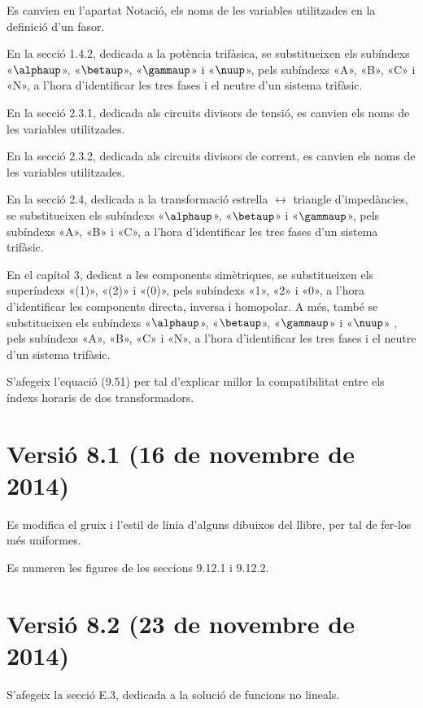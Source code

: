 Es canvien en l'apartat Notació, els noms de les variables utilitzades en la definició d'un fasor.

En la secció 1.4.2, dedicada a la potència trifàsica, se substitueixen els subíndexs «$\alphaup$», «$\betaup$», «$\gammaup$» i «$\nuup$», pels subíndexs «A», «B», «C» i «N», a l'hora d'identificar les tres fases  i el neutre d'un sistema trifàsic.

En la secció 2.3.1,  dedicada als circuits divisors de tensió, es canvien els noms de les variables utilitzades.

En la secció 2.3.2,  dedicada als circuits divisors de corrent, es canvien els noms de les variables utilitzades.

En la secció 2.4, dedicada a la transformació estrella $\boldsymbol{\leftrightarrow}$ triangle d'impedàncies, se substitueixen els subíndexs «$\alphaup$», «$\betaup$» i «$\gammaup$», pels subíndexs «A», «B» i «C», a l'hora d'identificar les tres fases d'un sistema trifàsic.

En el capítol 3, dedicat a les components simètriques, se substitueixen els superíndexs «(1)», «(2)» i «(0)», pels subíndexs «1», «2» i «0», a l'hora d'identificar les components directa, inversa i homopolar. A més, també se substitueixen els subíndexs «$\alphaup$», «$\betaup$», «$\gammaup$» i «$\nuup$» , pels subíndexs «A», «B»,  «C» i «N», a l'hora d'identificar les tres fases i el neutre d'un sistema trifàsic.

S'afegeix l'equació (9.51) per tal d'explicar millor la compatibilitat entre els índexs horaris de dos transformadors.

\section*{Versió 8.1 (16 de novembre de 2014)}

Es modifica el gruix i l'estil de línia d'alguns dibuixos del llibre, per tal de fer-los més uniformes.

Es numeren les figures de les seccions 9.12.1 i 9.12.2.


\section*{Versió 8.2 (23 de novembre de 2014)}

S'afegeix la secció E.3, dedicada a la solució de funcions no lineals.

